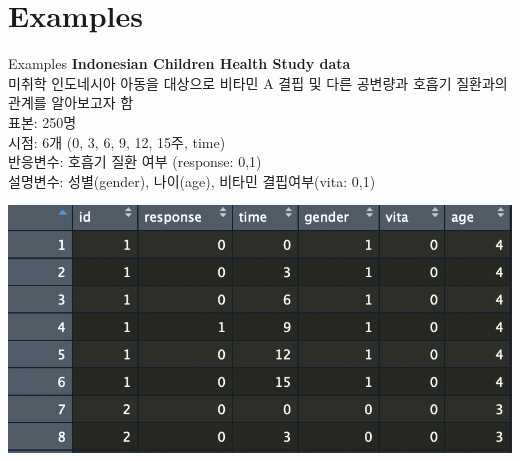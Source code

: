 \documentclass[9pt, xelatex]{beamer}
\begin{document}
\section{Examples}{
\begin{frame}[allowframebreaks]{Examples}
	\textbf{Indonesian Children Health Study data}\\
	\vspace{2mm}
	미취학 인도네시아 아동을 대상으로 비타민 A 결핍 및 다른 공변량과 호흡기 질환과의 관계를 알아보고자 함\\
	\vspace{1.5mm}
	표본: 250명 \\
	\vspace{1mm}
	시점: 6개 (0, 3, 6, 9, 12, 15주, time) \\
	\vspace{1mm}
	반응변수: 호흡기 질환 여부 (response: 0,1) \\
	\vspace{1mm}
	설명변수: 성별(gender), 나이(age), 비타민 결핍여부(vita: 0,1)\\
	\begin{center}
	\includegraphics[scale=0.4]{data.png}
	\end{center}
	
	\framebreak
	

\end{frame}}
\end{document}
